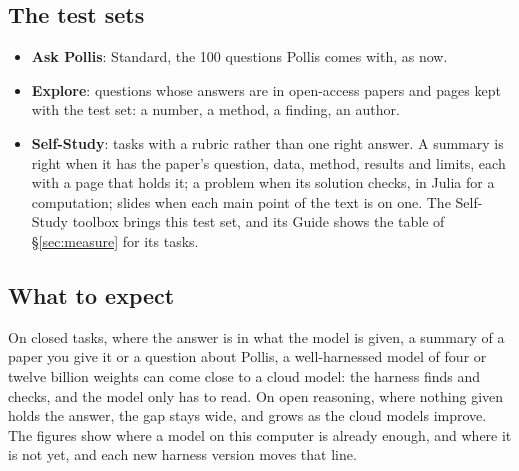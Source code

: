 \subsection{The test sets}\label{sec:sets}
\begin{itemize}
  \item \textbf{Ask Pollis}: Standard, the 100 questions Pollis comes with, as now.
  \item \textbf{Explore}: questions whose answers are in open-access papers and pages kept with the test set: a
    number, a method, a finding, an author.
  \item \textbf{Self-Study}: tasks with a rubric rather than one right answer. A summary is right when it has the
    paper's question, data, method, results and limits, each with a page that holds it; a problem when its solution
    checks, in Julia for a computation; slides when each main point of the text is on one. The Self-Study toolbox
    brings this test set, and its Guide shows the table of \S\ref{sec:measure} for its tasks.
\end{itemize}

\subsection{What to expect}
On closed tasks, where the answer is in what the model is given, a summary of a paper you give it or a question about
Pollis, a well-harnessed model of four or twelve billion weights can come close to a cloud model: the harness finds
and checks, and the model only has to read. On open reasoning, where nothing given holds the answer, the gap stays
wide, and grows as the cloud models improve. The figures show where a model on this computer is already enough, and
where it is not yet, and each new harness version moves that line.

